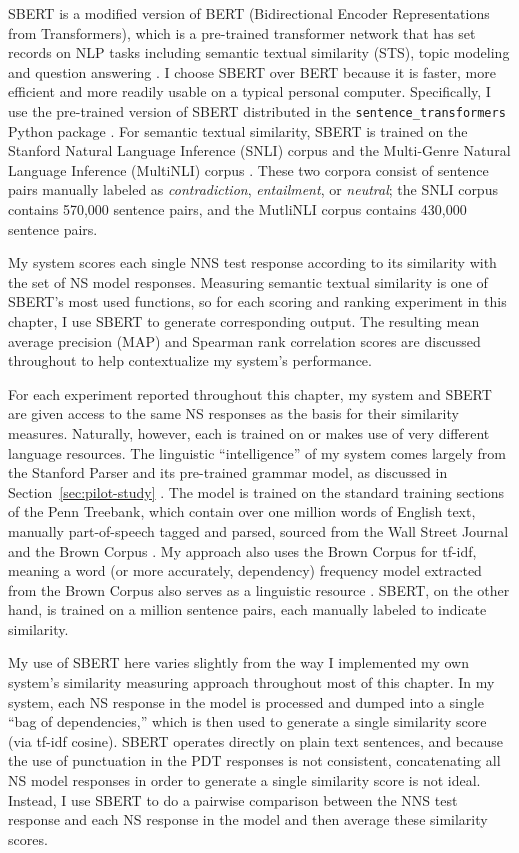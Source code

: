 SBERT is a modified version of BERT (Bidirectional Encoder Representations from Transformers), which is a pre-trained transformer network that has set records on NLP tasks including semantic textual similarity (STS), topic modeling and question answering \cite{BertDevlin2018}. I choose SBERT over BERT because it is faster, more efficient and more readily usable on a typical personal computer. Specifically, I use the pre-trained version of SBERT distributed in the \texttt{sentence\_transformers} Python package \cite{sbert-python}. For semantic textual similarity, SBERT is trained on the Stanford Natural Language Inference (SNLI) corpus \cite{bowman2015} and the Multi-Genre Natural Language Inference (MultiNLI) corpus \cite{MultiNLI2018}. These two corpora consist of sentence pairs manually labeled as \textit{contradiction}, \textit{entailment}, or \textit{neutral}; the SNLI corpus contains 570,000 sentence pairs, and the MutliNLI corpus contains 430,000 sentence pairs.
 
My system scores each single NNS test response according to its similarity with the set of NS model responses. Measuring semantic textual similarity is one of SBERT's most used functions, so for each scoring and ranking experiment in this chapter, I use SBERT to generate corresponding output. The resulting mean average precision (MAP) and Spearman rank correlation scores are discussed throughout to help contextualize my system's performance.

For each experiment reported throughout this chapter, my system and SBERT are given access to the same NS responses as the basis for their similarity measures. Naturally, however, each is trained on or makes use of very different language resources. The linguistic ``intelligence'' of my system comes largely from the Stanford Parser and its pre-trained grammar model, as discussed in Section~\ref{sec:pilot-study} \cite{klein:manning:03}. The model is trained on the standard training sections of the Penn Treebank, which contain over one million words of English text, manually part-of-speech tagged and parsed, sourced from the Wall Street Journal and the Brown Corpus \cite{marcus-et-al:93}. My approach also uses the Brown Corpus for tf-idf, meaning a word (or more accurately, dependency) frequency model extracted from the Brown Corpus also serves as a linguistic resource \cite{kucera:francis:67}. SBERT, on the other hand, is trained on a million sentence pairs, each manually labeled to indicate similarity.

My use of SBERT here varies slightly from the way I implemented my own system's similarity measuring approach throughout most of this chapter. In my system, each NS response in the model is processed and dumped into a single ``bag of dependencies,'' which is then used to generate a single similarity score (via tf-idf cosine). SBERT operates directly on plain text sentences, and because the use of punctuation in the PDT responses is not consistent, concatenating all NS model responses in order to generate a single similarity score is not ideal. Instead, I use SBERT to do a pairwise comparison between the NNS test response and each NS response in the model and then average these similarity scores.

